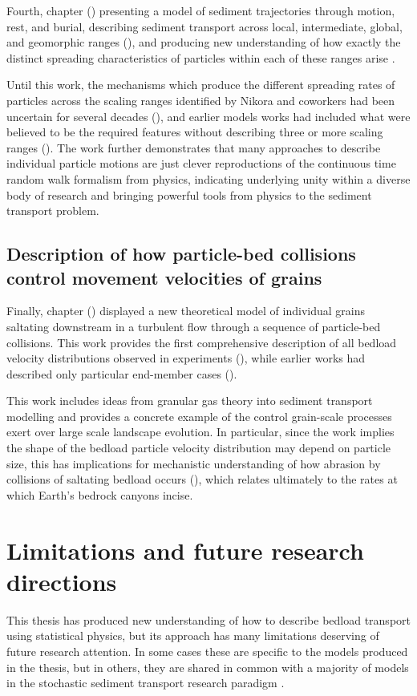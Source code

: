 Fourth, chapter () presenting a model of sediment trajectories through motion, rest, and burial, describing sediment transport across local, intermediate, global, and geomorphic ranges (), and producing new understanding of how exactly the distinct spreading characteristics of particles within each of these ranges arise \citep[e.g][]{Pretzslav2021}.

Until this work, the mechanisms which produce the different spreading rates of particles across the scaling ranges identified by Nikora and coworkers had been uncertain for several decades (), and earlier models works had included what were believed to be the required features without describing three or more scaling ranges (). 
The work further demonstrates that many approaches to describe individual particle motions are just clever reproductions of the continuous time random walk formalism from physics, indicating underlying unity within a diverse body of research and bringing powerful tools from physics to the sediment transport problem.

\subsection{Description of how particle-bed collisions control movement velocities of grains}

Finally, chapter () displayed a new theoretical model of individual grains saltating downstream in a turbulent flow through a sequence of particle-bed collisions.
This work provides the first comprehensive description of all bedload velocity distributions observed in experiments (), while earlier works had described only particular end-member cases ().

This work includes ideas from granular gas theory into sediment transport modelling and provides a concrete example of the control grain-scale processes exert over large scale landscape evolution. In particular, since the work implies the shape of the bedload particle velocity distribution may depend on particle size, this has implications for mechanistic understanding of how abrasion by collisions of saltating bedload occurs (), which relates ultimately to the rates at which Earth's bedrock canyons incise.

\section{Limitations and future research directions}

This thesis has produced new understanding of how to describe bedload transport using statistical physics, but its approach has many limitations deserving of future research attention.
In some cases these are specific to the models produced in the thesis, but in others, they are shared in common with a majority of models in the stochastic sediment transport research paradigm \citep{Ancey2020,Furbish2021a}.

